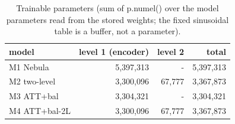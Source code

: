 \begin{table}[t]
\centering
\small
\caption{Trainable parameters (sum of p.numel() over the model parameters read from the stored weights; the fixed sinusoidal table is a buffer, not a parameter).}
\label{tab:T3_parameter_counts}
\begin{tabular}{lrrr}
\toprule
model & level 1 (encoder) & level 2 & total \\
\midrule
M1 Nebula & 5,397,313 & - & 5,397,313 \\
M2 two-level & 3,300,096 & 67,777 & 3,367,873 \\
M3 ATT+bal & 3,304,321 & - & 3,304,321 \\
M4 ATT+bal-2L & 3,300,096 & 67,777 & 3,367,873 \\
\bottomrule
\end{tabular}
\end{table}
